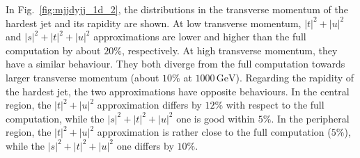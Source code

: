 \documentclass[twocolumn,epjc3]{svjour3} %
\newcommand{\GeV}{\ensuremath{\,\text{GeV}}\xspace}
\begin{document}
    In Fig.~\ref{fig:mjjdyjj_1d_2}, the distributions in the transverse momentum of the hardest jet and its rapidity are shown.
    At low transverse momentum, $|t|^2+|u|^2$ and $|s|^2+|t|^2+|u|^2$ approximations are lower and higher than the full computation by about $20\%$, respectively.
    At high transverse momentum, they have a similar behaviour.
    They both diverge from the full computation towards larger transverse momentum (about $10\%$ at $1000\GeV$).
    Regarding the rapidity of the hardest jet, the two approximations have opposite behaviours.
    In the central region, the $|t|^2+|u|^2$ approximation differs by $12\%$ with respect to the full computation, while the $|s|^2+|t|^2+|u|^2$ one is good within $5\%$.
    In the peripheral region, the $|t|^2+|u|^2$ approximation is rather close to the full computation ($5\%$), while the $|s|^2+|t|^2+|u|^2$ one differs by $10\%$.
\end{document}
